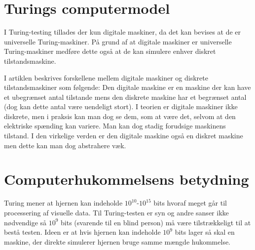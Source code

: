 \documentclass{article}
\author{Mikkel Kragh Mathiesen, Jannik Gram, Rune \& Rasmus Abrahams{\tt (son|en)}}
\title{}
\date{\today}
\begin{document}
\maketitle
\section{Turings computermodel}




I Turing-testing tillades der kun digitale maskiner, da det kan bevises at de er universelle Turing-maskiner. På grund af at digitale maskiner er universelle Turing-maskiner medføre dette også at de kan simulere enhver diskret tilstandsmaskine.

I artiklen beskrives forskellene mellem digitale maskiner og diskrete tilstandsmaskiner som følgende:
Den digitale maskine er en maskine der kan have et ubegrænset antal tilstande mens den diskrete maskine har et begrænset antal (dog kan dette antal være uendeligt stort). %
I teorien er digitale maskiner ikke diskrete, men i praksis kan man dog se dem, som at være det, selvom at den elektriske spænding kan variere. Man kan dog stadig forudsige maskinens tilstand.
I den virkelige verden er den digitale maskine også en diskret maskine men dette kan man dog abstrahere væk.

\section{Computerhukommelsens betydning}
Turing mener at hjernen kan indeholde $10^{10}$-$10^{15}$ bits hvoraf meget går til processering af visuelle data. Til Turing-testen er syn og andre sanser ikke nødvendige så  $10^9$ bits (svarende til en blind person) må være tilstrækkeligt til at bestå testen.
Ideen er at hvis hjernen kan indeholde $10^9$ bits lager så skal en maskine, der direkte simulerer hjernen bruge samme mængde hukommelse.
\end{document}
